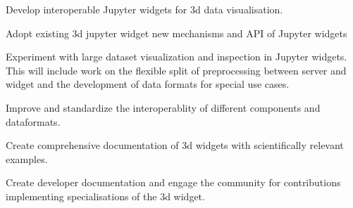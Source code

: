\begin{task}[
  title=Jupyter Interactive Widgets,
  id=jupyter-widgets,
  lead=QS,
  PM=40,
  wphases={0-48},
  partners={XFEL,SIL}
]
\begin{compactenum}
\item
  Develop interoperable Jupyter widgets for 3d data visualisation.

  \begin{compactenum}
  \item 
    Adopt existing 3d jupyter widget new mechanisms and API of Jupyter widgets

  \item
    Experiment with large dataset visualization and inspection in Jupyter widgets. This will include work on the flexible split of preprocessing between server and widget and the development of data formats for special use cases. 
    
  \item 
    Improve and standardize the interoperablity of  different components and dataformats. 
    
  \item 
    Create comprehensive documentation of 3d widgets with scientifically relevant examples.

  \item 
    Create developer documentation and engage the community for contributions implementing specialisations of the 3d widget.
  
  \end{compactenum}

\end{compactenum}

\end{task}
